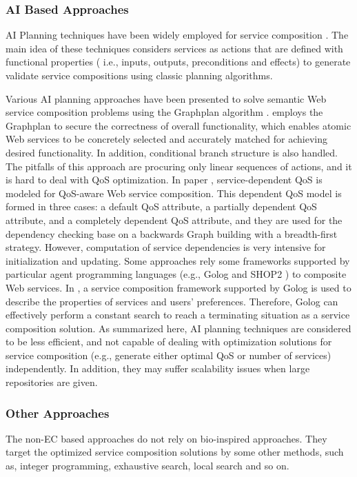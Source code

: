 \subsubsection{AI Based Approaches}

AI Planning techniques have been widely employed for service composition \cite{markou2015non,peer2005web}. The main idea of these techniques considers services as actions that are defined with functional properties ( i.e., inputs, outputs, preconditions and effects) to generate validate service compositions using classic planning algorithms. 

Various AI planning approaches \cite{feng2013dynamic,huang2009effective,rao2006mixed,wang2013genetic, wang2014automated} have been presented to solve semantic Web service composition problems using the Graphplan algorithm \cite{blum1997fast}. \cite{wang2014automated} employs the Graphplan to secure the correctness of overall functionality, which enables atomic Web services to be concretely selected and accurately matched for achieving desired functionality. In addition, conditional branch structure is also handled. The pitfalls of this approach are procuring only linear sequences of actions, and it is hard to deal with QoS optimization. In paper \cite{feng2013dynamic}, service-dependent QoS is modeled for QoS-aware Web service composition. This dependent QoS model is formed in three cases: a default QoS attribute, a partially dependent QoS attribute, and a completely dependent QoS attribute, and they are used for the dependency checking base on a backwards Graph building with a breadth-first strategy. However, computation of service dependencies is very intensive for initialization and updating. Some approaches \cite{lecue2007making,sohrabi2009Web} rely some frameworks supported by particular agent programming languages (e.g., Golog \cite{sohrabi2009Web}  and SHOP2 \cite{sirin2004htn}) to composite Web services. In \cite{sohrabi2009Web}, a service composition framework supported by Golog is used to describe the properties of services and users' preferences. Therefore, Golog can effectively perform a constant search to reach a terminating situation as a service composition solution. As summarized here, AI planning techniques are considered to be less efficient, and not capable of dealing with optimization solutions for service composition (e.g., generate either optimal QoS or number of services) independently. In addition, they may suffer scalability issues when large repositories are given. 

\subsubsection{Other Approaches}
The non-EC based approaches do not rely on bio-inspired approaches. They target the optimized service composition solutions by some other methods, such as, integer programming, exhaustive search, local search and so on.

